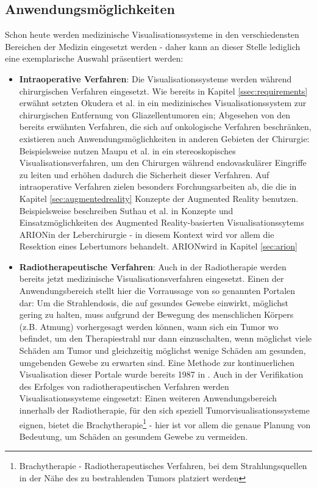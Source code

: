 \documentclass[pdftex,a4paper,titlepage,12pt]{scrartcl}
\newtheorem[L]{boxedDefinition}{Definition}
\begin{document}
\subsection{Anwendungsmöglichkeiten}\label{ssec:applications}
Schon heute werden medizinische Visualisationssysteme in den verschiedensten Bereichen der Medizin eingesetzt werden - daher kann an dieser Stelle lediglich eine exemplarische Auswahl präsentiert werden:
\begin{itemize}
 \item \textbf{Intraoperative Verfahren}: Die Visualisationssysteme werden während chirurgischen Verfahren eingesetzt. Wie bereits in Kapitel \ref{ssec:requirements} erwähnt setzten Okudera et al. in \cite{Okudera1994} ein medizinisches Visualisationssystem zur chirurgischen Entfernung von Gliazellentumoren ein;  Abgesehen von den bereits erwähnten Verfahren, die sich auf onkologische Verfahren beschränken, existieren auch Anwendungsmöglichkeiten in anderen Gebieten der Chirurgie: Beispielsweise nutzen Maupu et al. in \cite{Maupu2005} ein stereoskopisches Visualisationsverfahren, um den Chirurgen während endovaskulärer Eingriffe zu leiten und erhöhen dadurch die Sicherheit dieser Verfahren. Auf intraoperative Verfahren zielen besonders Forchungsarbeiten ab, die die in Kapitel \vref{sec:augmentedreality} Konzepte der Augmented Reality benutzen. Beispielsweise beschreiben Suthau et al. in \cite{Suthau2002DE}  Konzepte und Einsatzmöglichkeiten des Augmented Reality-basierten Visualisationssytems ARION\texttrademark in der Leberchirurgie - in diesem Kontext wird vor allem die Resektion eines Lebertumors behandelt. ARION\texttrademark wird in Kapitel \vref{sec:arion}
 \item \textbf{Radiotherapeutische Verfahren}: Auch in der Radiotherapie werden bereits jetzt medizinische Visualisationsverfahren eingesetzt. Einen der Anwendungsbereich stellt hier die Vorraussage von so genannten Portalen dar: Um die Strahlendosis, die auf gesundes Gewebe einwirkt, möglichst gering zu halten, muss aufgrund der Bewegung des menschlichen Körpers (z.B. Atmung) vorhergesagt werden können, wann sich ein Tumor wo befindet, um den Therapiestrahl nur dann einzuschalten, wenn möglichst viele Schäden am Tumor und gleichzeitig möglichst wenige Schäden am gesunden, umgebenden Gewebe zu erwarten sind. Eine Methode zur kontinuerlichen Visualisation dieser Portale wurde bereits 1987 in \cite{Leong1987}. Auch in der Verifikation des Erfolges von radiotherapeutischen Verfahren werden Visualisationssysteme eingesetzt:
 Einen weiteren Anwendungsbereich innerhalb der Radiotherapie, für den sich speziell Tumorvisualisationssysteme eignen, bietet die Brachytherapie\footnote{Brachytherapie - Radiotherapeutisches Verfahren, bei dem Strahlungsquellen in der Nähe des zu bestrahlenden Tumors platziert werden} - hier ist vor allem die genaue Planung von Bedeutung, um Schäden an gesundem Gewebe zu vermeiden.

\end{itemize}
\end{document}
